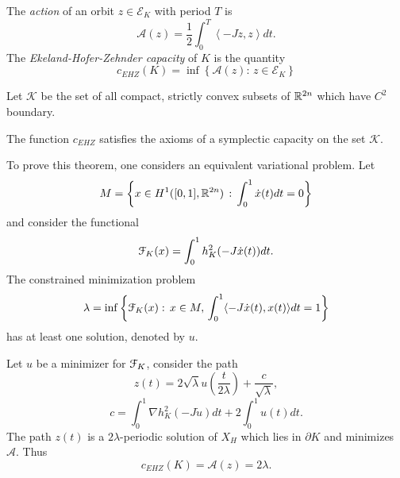 \documentclass[../capacities_main.tex]{subfiles}
\begin{document}
	\begin{Definition}
		The \emph{action} of an orbit $z \in \mathcal{E}_K$ with period $T$ is
		\begin{equation*}
		\mathcal{A}(z) = \frac{1}{2}\int_{0}^T \left<-J\dot z,z\right> dt.
		\end{equation*}
		The \emph{Ekeland-Hofer-Zehnder capacity} of $K$ is the quantity
		\begin{equation*}
		c_{EHZ}(K) = \inf\left\{\mathcal{A}(z): \, z\in \mathcal{E}_K\right\}
		\end{equation*}
	\end{Definition}
	Let $\mathcal{K}$ be the set of all compact, strictly convex subsets of ${\mathbb R}^{2n}$ which have $C^2$ boundary.
	\begin{Theorem}
		The function $c_{EHZ}$ satisfies the axioms of a symplectic capacity on the set $\mathcal{K}$.
	\end{Theorem}
	
	To prove this theorem, one considers an equivalent variational problem. Let 
	\begin{equation*}
	M = \left\{ x\in H^{1}([0,1],{\mathbb R}^{2n})\,:\, \int_0^1 \dot x(t)dt = 0\right\}
	\end{equation*}
	and consider the functional 
	\begin{equation} \label{eq:functional}
	{\mathcal F}_K(x) = \int_0^1h_K^2(-J\dot x(t))dt.
	\end{equation}
	The constrained minimization problem 
	\begin{equation}\label{MinProblem}
	\lambda = \inf\left\{ {\mathcal F}_K(x) : \, x\in M,\, \int_0^1\langle -J\dot x(t),x(t)\rangle dt = 1\right\}
	\end{equation}
	has at least one solution, denoted by $u$. 
	
	\begin{Proposition}
		Let $u$ be a minimizer for ${\mathcal F}_K$, consider the path 
		\begin{equation}
		z(t) = 2\sqrt{\lambda} u\left(\frac{t}{2\lambda}\right) + \frac{c}{\sqrt{\lambda}},
		\end{equation}
		\begin{equation}
		c=\int_0^1 \nabla h_K^2(-J\dot u)dt + 2\int_0^1 u(t) dt.
		\end{equation}
		The path $z(t)$ is a $2\lambda$-periodic solution of $X_H$ which lies in $\partial K$ and minimizes $\mathcal{A}$. Thus
		\begin{equation*}
		c_{EHZ}(K)  = \mathcal{A}(z) = 2\lambda.
		\end{equation*}
	\end{Proposition}
	
\end{document}
